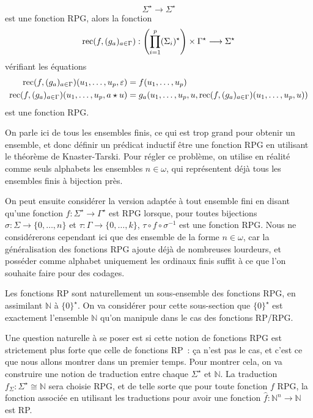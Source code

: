 \begin{definition}
\begin{itemize}
\[    \Sigma^\star\to\Sigma^\star\]
    est une fonction RPG, alors la fonction
    \[\operatorname{rec}(f,(g_a)_{a \in \Gamma}) : \left(\prod_{i = 1}^p (\Sigma_i)^\star\right)
    \times \Gamma^\star \longrightarrow \Sigma^\star \]
    vérifiant les équations
    \begin{align*}
      \operatorname{rec}(f,(g_a)_{a\in\Gamma})(u_1,\ldots,u_p,\varepsilon) &=
      f(u_1,\ldots,u_p)\\
      \operatorname{rec}(f,(g_a)_{a\in\Gamma})(u_1,\ldots,u_p,a\star u) &=
      g_a(u_1,\ldots,u_p,u,\operatorname{rec}(f,(g_a)_{a \in \Gamma})(u_1,\ldots,u_p,u))
    \end{align*}
    est une fonction RPG.
  \end{itemize}
\end{definition}

\begin{remark}
  On parle ici de tous les ensembles finis, ce qui est trop grand pour obtenir
  un ensemble, et donc définir un prédicat inductif \og être une fonction RPG\fg
  en utilisant le théorème de Knaster-Tarski. Pour régler ce problème, on
  utilise en réalité comme seuls alphabets les ensembles $n \in \omega$, qui
  représentent déjà tous les ensembles finis à bijection près.

  On peut ensuite considérer la version adaptée à tout ensemble fini en disant
  qu'une fonction $f : \Sigma^\star \to \Gamma^\star$ est RPG lorsque,
  pour toutes bijections $\sigma : \Sigma \to \{0,\ldots,n\}$ et
  $\tau : \Gamma\to\{0,\ldots,k\}$, $\tau\circ f \circ \sigma^{-1}$ est une
  fonction RPG. Nous ne considérerons cependant ici que des ensemble de la forme
  $n \in \omega$, car la généralisation des fonctions RPG ajoute déjà de
  nombreuses lourdeurs, et posséder comme alphabet uniquement les ordinaux finis
  suffit à ce que l'on souhaite faire pour des codages.
\end{remark}

Les fonctions RP sont naturellement un sous-ensemble des fonctions RPG, en
assimilant $\mathbb N$ à $\{0\}^\star$. On va considérer pour cette sous-section
que $\{0\}^\star$ est exactement l'ensemble $\mathbb N$ qu'on manipule dans le
cas des fonctions RP/RPG.

Une question naturelle à se poser est si cette notion de fonctions RPG est
strictement plus forte que celle de fonctions RP~: ça n'est pas le cas, et c'est
ce que nous allons montrer dans un premier temps. Pour montrer cela, on va
construire une notion de traduction entre chaque $\Sigma^\star$ et $\mathbb N$.
La traduction $f_\Sigma : \Sigma^\star \cong \mathbb N$ sera choisie RPG, et de
telle sorte que pour toute fonction $f$ RPG, la fonction associée en utilisant
les traductions pour avoir une fonction $\hat{f} : \mathbb N^n \to \mathbb N$
est RP.

